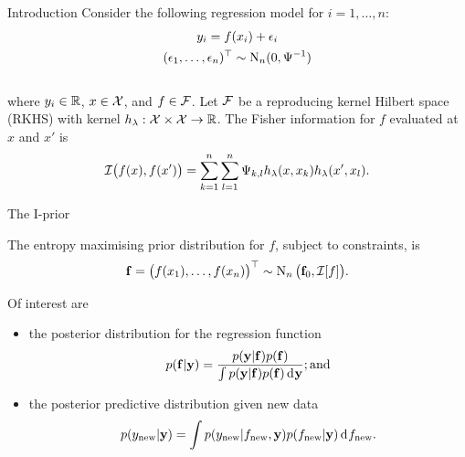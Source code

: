 \documentclass{beamer}
\newlength{\onecolwid}
\begin{document}
\begin{frame}[t]
\begin{columns}[t]
\begin{column}{\onecolwid}
\begin{block}{Introduction}
Consider the following regression model for $i=1,\dots,n$:
~\\[-20pt]
\begin{align}\label{eq:normalmodel}
  \begin{gathered}
      y_i = f(x_i) + \epsilon_i \\
    (\epsilon_1, \dots, \epsilon_n)^\top \sim \operatorname{N}_n(0,\Psi^{-1})
  \end{gathered}
\end{align}
~\\[-7pt]
where $y_i \in \mathbb{R}$, $x \in {\mathcal X}$, and $f \in {\mathcal F}$. Let ${\mathcal F}$ be a reproducing kernel Hilbert space (RKHS) with kernel $h_\lambda:{\mathcal X} \times {\mathcal X} \to \mathbb{R}$. The Fisher information for $f$ evaluated at $x$ and $x'$ is
~\\[-20pt]
\begin{align}
  {\mathcal I}\big(f(x), f(x')\big) = \sum_{k=1}^n \sum_{l=1}^n \Psi_{k,l} h_\lambda(x,x_k) h_\lambda(x',x_l).
\end{align}

\begin{alertblock}{The I-prior}

The entropy maximising prior distribution for $f$, subject to constraints, is 
\[
  {\mathbf f} = \big(f(x_1),\dots,f(x_n) \big)^\top \sim \operatorname{N}_n \big({\mathbf f}_0, {\mathcal I}[f] \big).
\]

\vspace{10pt}

\end{alertblock}

\vspace{-10pt}
Of interest are 

\newcommand{\new}{{\text{new}}}
\begin{itemize}
  \item the posterior distribution for the regression function
  \[
    p({\mathbf f}|{\mathbf y}) = \frac{p({\mathbf y}|{\mathbf f}) p({\mathbf f})}{\int p({\mathbf y}|{\mathbf f}) p({\mathbf f}) \operatorname{d\!\:\!} {\mathbf y}}; \text{and}
  \]
  \item the posterior predictive distribution given new data
  \[
    p(y_\new|\by) = \int p(y_\new|f_\new,\by) p(f_\new|\by) \d f_\new.
  \]
\end{itemize}

\end{block}




\end{column}
\end{columns}
\end{frame}
\end{document}
